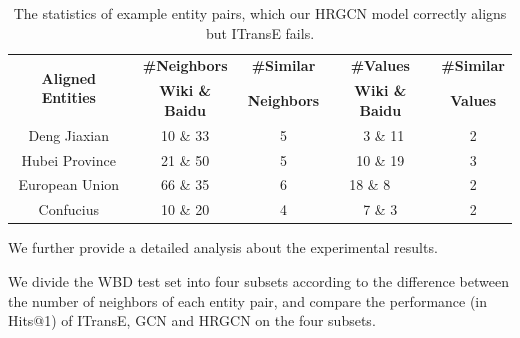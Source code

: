 \begin{table}
	\centering
	\scriptsize
	\begin{tabular}{ccccc}
		\toprule
		\multirow{2}{*}{\bf Aligned Entities} & \bf \#Neighbors & \bf \#Similar & \bf \#Values & \bf \#Similar \\
		&\bf  Wiki \& Baidu &\bf  Neighbors &\bf  Wiki \& Baidu &\bf  Values \\
		\midrule
		Deng Jiaxian & 10 \& 33 & 5 & \ 3 \& 11 & 2\\
		Hubei Province & 21 \& 50 & 5 & 10 \& 19 & 3\\
		European Union & 66 \& 35 & 6 & 18 \& 8\ \ \ & 2\\
		Confucius & 10 \& 20 & 4 & 7 \& 3 & 2\\
		\bottomrule
	\end{tabular}
	\caption{The statistics of example entity pairs, which our HRGCN model correctly aligns but ITransE fails.}
	\label{example}
\end{table}
	
	We further provide a detailed analysis about the experimental results.
	
	We divide the WBD test set into four subsets according to the difference between the number of neighbors of each entity pair, and compare the performance (in Hits@1) of ITransE, GCN and HRGCN on the four subsets.
	

